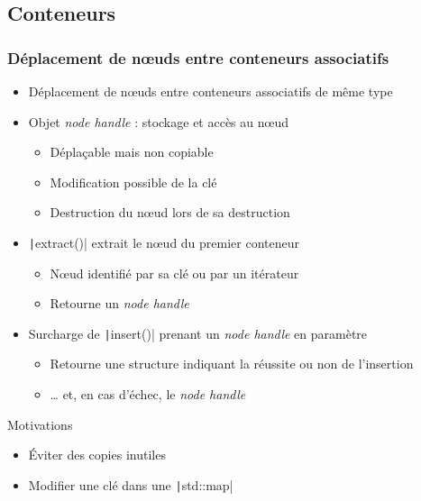 \documentclass[C++.tex]{subfiles}
\begin{document}
\subsection*{Conteneurs}
\begin{frame}[fragile]
	\frametitle{Déplacement de nœuds entre conteneurs associatifs}
	\begin{itemize}
		\item Déplacement de nœuds entre conteneurs associatifs de même type
		\item Objet \textit{node handle} : stockage et accès au nœud
		\begin{itemize}
			\item Déplaçable mais non copiable
			\item Modification possible de la clé
			\item Destruction du nœud lors de sa destruction
		\end{itemize}
		\item \texttt|extract()| extrait le nœud du premier conteneur
		\begin{itemize}
			\item Nœud identifié par sa clé ou par un itérateur
			\item Retourne un \textit{node handle}
		\end{itemize}
		\item Surcharge de \texttt|insert()| prenant un \textit{node handle} en paramètre
		\begin{itemize}
			\item Retourne une structure indiquant la réussite ou non de l'insertion
			\item \ldots{} et, en cas d'échec, le \textit{node handle}
		\end{itemize}
	\end{itemize}

	\begin{block}{Motivations}
		\begin{itemize}
			\item Éviter des copies inutiles
			\item Modifier une clé dans une \texttt|std::map|
		\end{itemize}
	\end{block}
\end{frame}
\end{document}
